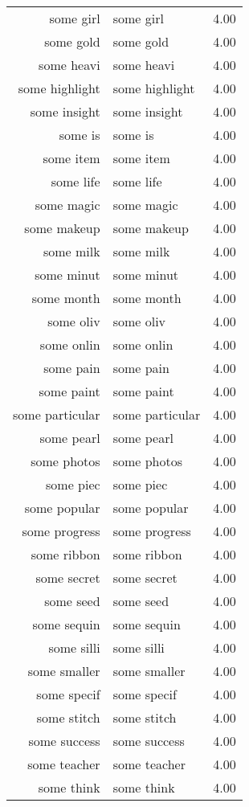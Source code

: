 \begin{table}[ht]
\begin{tabular}{rlr}
  some girl & some girl & 4.00 \\ 
  some gold & some gold & 4.00 \\ 
  some heavi & some heavi & 4.00 \\ 
  some highlight & some highlight & 4.00 \\ 
  some insight & some insight & 4.00 \\ 
  some is & some is & 4.00 \\ 
  some item & some item & 4.00 \\ 
  some life & some life & 4.00 \\ 
  some magic & some magic & 4.00 \\ 
  some makeup & some makeup & 4.00 \\ 
  some milk & some milk & 4.00 \\ 
  some minut & some minut & 4.00 \\ 
  some month & some month & 4.00 \\ 
  some oliv & some oliv & 4.00 \\ 
  some onlin & some onlin & 4.00 \\ 
  some pain & some pain & 4.00 \\ 
  some paint & some paint & 4.00 \\ 
  some particular & some particular & 4.00 \\ 
  some pearl & some pearl & 4.00 \\ 
  some photos & some photos & 4.00 \\ 
  some piec & some piec & 4.00 \\ 
  some popular & some popular & 4.00 \\ 
  some progress & some progress & 4.00 \\ 
  some ribbon & some ribbon & 4.00 \\ 
  some secret & some secret & 4.00 \\ 
  some seed & some seed & 4.00 \\ 
  some sequin & some sequin & 4.00 \\ 
  some silli & some silli & 4.00 \\ 
  some smaller & some smaller & 4.00 \\ 
  some specif & some specif & 4.00 \\ 
  some stitch & some stitch & 4.00 \\ 
  some success & some success & 4.00 \\ 
  some teacher & some teacher & 4.00 \\ 
  some think & some think & 4.00 \\ 

\end{tabular}
\end{table}
